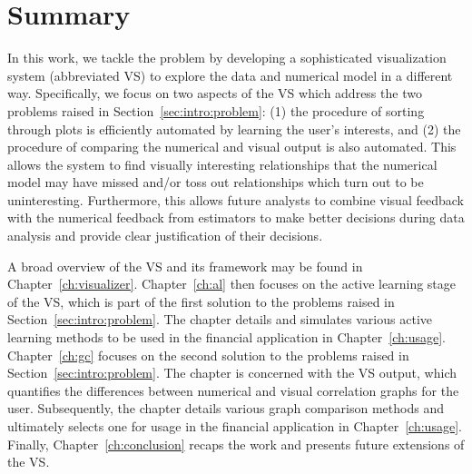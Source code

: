 \section{Summary}
\label{sec:intro:summary}

In this work, we tackle the problem by developing a sophisticated visualization
system (abbreviated VS) to explore the data and numerical model in a different
way. Specifically, we focus on two aspects of the VS which address the two
problems raised in Section~\ref{sec:intro:problem}: (1) the procedure of sorting
through plots is efficiently automated by learning the user's interests, and (2)
the procedure of comparing the numerical and visual output is also automated.
This allows the system to find visually interesting relationships that the
numerical model may have missed and/or toss out relationships which turn out to
be uninteresting. Furthermore, this allows future analysts to combine visual
feedback with the numerical feedback from estimators to make better decisions
during data analysis and provide clear justification of their decisions.

A broad overview of the VS and its framework may be found in
Chapter~\ref{ch:visualizer}. Chapter~\ref{ch:al} then focuses on the active
learning stage of the VS, which is part of the first solution to the problems
raised in Section~\ref{sec:intro:problem}. The chapter details and simulates
various active learning methods to be used in the financial application in
Chapter~\ref{ch:usage}. Chapter~\ref{ch:gc} focuses on the second solution to
the problems raised in Section~\ref{sec:intro:problem}. The chapter is concerned
with the VS output, which quantifies the differences between numerical and
visual correlation graphs for the user. Subsequently, the chapter details
various graph comparison methods and ultimately selects one for usage in the
financial application in Chapter~\ref{ch:usage}. Finally,
Chapter~\ref{ch:conclusion} recaps the work and presents future extensions of
the VS.

